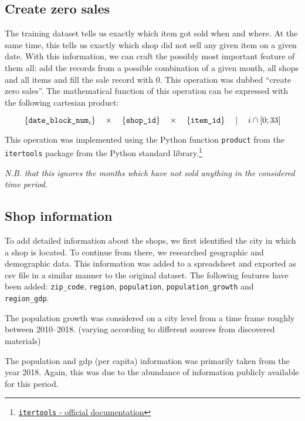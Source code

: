 \subsection{Create zero sales}

The training dataset tells us exactly which item got sold when and where. At the same time, this tells us exactly which shop did not sell any given item on a given date.
With this information, we can craft the possibly most important feature of them all: add the records from a possible combination of a given month, all shops and all items and fill the sale record with 0. This operation was dubbed \enquote{create zero sales}.
The mathematical function of this operation can be expressed with the following cartesian product:

\vspace*{-4mm}
$$
\{\text{\texttt{date\_block\_num}}_i\}
\quad \times \quad
\{{\text{\texttt{shop\_id}}}\}
\quad  \times \quad 
\{{\text{\texttt{item\_id}}}\}
\quad \mid \quad
i \cap [0; 33]
$$

This operation was implemented using the Python function \texttt{product} from the \texttt{itertools} package from the Python standard library.\footnote{\href{https://docs.python.org/3/library/itertools.html\#itertools.product}{\texttt{itertools} - official documentation}}

\noindent \textit{N.B. that this ignores the months which have not sold anything in the considered time period.}

\subsection{Shop information}

To add detailed information about the shops, we first identified the city in which a shop is located. To continue from there, we researched geographic and demographic data. This information was added to a spreadsheet and exported as \acrfull{csv} file in a similar manner to the original dataset. The following features have been added: \texttt{zip\_code}, \texttt{region}, \texttt{population}, \texttt{population\_growth} and \texttt{region\_gdp}.

The population growth was considered on a city level from a time frame roughly between 2010--2018. (varying according to different sources from discovered materials)

The population and gdp (per capita) information was primarily taken from the year 2018. Again, this was due to the abundance of information publicly available for this period.

